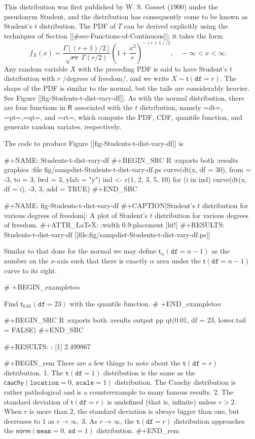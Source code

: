 This distribution was first published by W. S. Gosset (1900) under the
pseudonym Student, and the distribution has consequently come to be
known as Student's \(t\) distribution. The PDF of \(T\) can be derived
explicitly using the techniques of Section [[#sec-Functions-of-Continuous]]; it takes the form
\begin{equation}
f_{X}(x)=\frac{\Gamma[(r+1)/2]}{\sqrt{r\pi}\ \Gamma(r/2)}\left(1+\frac{x^{2}}{r}\right)^{-(r+1)/2},\quad -\infty < x < \infty.
\end{equation}
Any random variable \(X\) with the preceding PDF is said to have
Student's \(t\) distribution with \(r\) /degrees of freedom/, and we
write \(X\sim\mathsf{t}(\mathtt{df}=r)\). The shape of the PDF is
similar to the normal, but the tails are considerably heavier. See
Figure [[fig-Students-t-dist-vary-df]]. As with the normal distribution,
there are four functions in \(\mathsf{R}\) associated with the \(t\)
distribution, namely =dt=, =pt=,=qt=, and =rt=, which compute the PDF,
CDF, quantile function, and generate random variates, respectively.

The code to produce Figure [[fig-Students-t-dist-vary-df]] is

#+NAME: Students-t-dist-vary-df
#+BEGIN_SRC R :exports both :results graphics :file fig/sampdist-Students-t-dist-vary-df.ps
curve(dt(x, df = 30), from = -3, to = 3, lwd = 3, ylab = "y")
ind <- c(1, 2, 3, 5, 10)
for (i in ind) curve(dt(x, df = i), -3, 3, add = TRUE)
#+END_SRC

#+NAME: fig-Students-t-dist-vary-df
#+CAPTION[Student's \(t\) distribution for various degrees of freedom]: \small A plot of Student's \(t\) distribution for various degrees of freedom.
#+ATTR_LaTeX: :width 0.9\textwidth :placement [ht!]
#+RESULTS: Students-t-dist-vary-df
[[file:fig/sampdist-Students-t-dist-vary-df.ps]]

Similar to that done for the normal we may define
\(\mathsf{t}_{\alpha}(\mathtt{df}=n-1)\) as the number on the
\(x\)-axis such that there is exactly \(\alpha\) area under the
\(\mathsf{t}(\mathtt{df}=n-1)\) curve to its right.

# +BEGIN_exampletoo

Find \(\mathsf{t}{}_{0.01}(\mathtt{df}=23)\) with the quantile
function.
# +END_exampletoo

#+BEGIN_SRC R :exports both :results output pp 
qt(0.01, df = 23, lower.tail = FALSE)
#+END_SRC

#+RESULTS:
: [1] 2.499867

#+BEGIN_rem
There are a few things to note about the \(\mathtt{t}(\mathtt{df}=r)\)
distribution.
1. The \(\mathtt{t}(\mathtt{df}=1)\) distribution is the same as the
   \(\mathsf{cauchy}(\mathtt{location}=0,\,\mathtt{scale}=1)\)
   distribution. The Cauchy distribution is rather pathological and is
   a counterexample to many famous results.
2. The standard deviation of \(\mathsf{t}(\mathtt{df}=r)\) is
   undefined (that is, infinite) unless \(r>2\). When \(r\) is more
   than 2, the standard deviation is always bigger than one, but
   decreases to 1 as \(r\to\infty\).
3. As \(r\to\infty\), the \(\mathtt{t}(\mathtt{df}=r)\) distribution
   approaches the \(\mathsf{norm}(\mathtt{mean}=0,\,\mathtt{sd}=1)\)
   distribution.
#+END_rem

